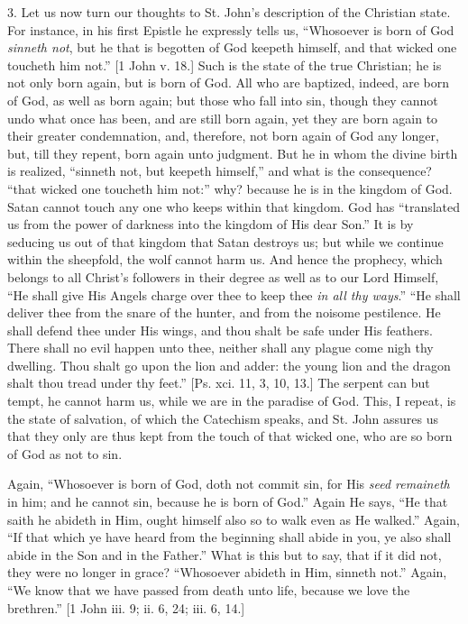 3. Let us now turn our thoughts to St. John's description of the
Christian state. For instance, in his first Epistle he expressly tells
us, ``Whosoever is born of God \emph{sinneth not}, but he that is
begotten of God keepeth himself, and that wicked one toucheth him
not.'' [1 John v. 18.] Such is the state of the true Christian; he
is not only born again, but is born of God. All who are baptized,
indeed, are born of God, as well as born again; but those who fall
into sin, though they cannot undo what once has been, and are still
born again, yet they are born again to their greater condemnation,
and, therefore, not born again of God any longer, but, till they
repent, born again unto judgment. But he in whom the divine birth is
realized, ``sinneth not, but keepeth himself,'' and what is
the consequence? ``that wicked one toucheth him not:'' why?
because he is in the kingdom of God. Satan cannot touch any one who
keeps within that kingdom. God has ``translated us from the power
of darkness into the kingdom of His dear Son.'' It is by seducing
us out of that kingdom that Satan destroys us; but while we continue
within the sheepfold, the wolf cannot harm us. And hence the prophecy,
which belongs to all Christ's followers in their degree as well as to
our Lord Himself, ``He shall give His Angels charge over thee to
keep thee \emph{in all thy ways}.'' ``He shall deliver thee
from the snare of the hunter, and from the noisome pestilence. He
shall defend thee under His wings, and thou shalt be safe under His
feathers. There shall no evil happen unto thee, neither shall any
plague come nigh thy dwelling. Thou shalt go upon the lion and adder:
the young lion and the dragon shalt thou tread under thy feet.''
[Ps. xci. 11, 3, 10, 13.] The serpent can but tempt, he cannot harm
us, while we are in the paradise of God. This, I repeat, is the state
of salvation, of which the Catechism speaks, and St. John assures us
that they only are thus kept from the touch of that wicked one, who
are so born of God as not to sin.

Again, ``Whosoever is born of God, doth not commit sin, for His
\emph{seed remaineth} in him; and he cannot sin, because he is born of
God.'' Again He says, ``He that saith he abideth in Him, ought
himself also so to walk even as He walked.'' Again, ``If that
which ye have heard from the beginning shall abide in you, ye also
shall abide in the Son and in the Father.'' What is this but to
say, that if it did not, they were no longer in grace? ``Whosoever
abideth in Him, sinneth not.'' Again, ``We know that we have
passed from death unto life, because we love the brethren.'' [1
John iii. 9; ii. 6, 24; iii. 6, 14.]

